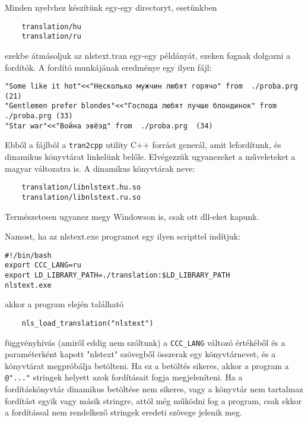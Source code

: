 Minden nyelvhez készítünk egy-egy directoryt, esetünkben 
\begin{verbatim}
    translation/hu
    translation/ru
\end{verbatim}
ezekbe átmásoljuk az nlstext.tran egy-egy példányát, 
ezeken fognak dolgozni a fordítók. A fordító munkájának
eredménye egy ilyen fájl:
\begin{verbatim}
"Some like it hot"<<"Несколько мужчин любят горячо" from  ./proba.prg  (21)
"Gentlemen prefer blondes"<<"Господа любят лучше блондинок" from ./proba.prg (33)
"Star war"<<"Война эвёэд" from  ./proba.prg  (34)
\end{verbatim}
Ebből a fájlból a \verb!tran2cpp! utility  C++ forrást generál,
amit lefordítunk, és  dinamikus könyvtárat linkelünk belőle.
Elvégezzük ugyanezeket a műveleteket a magyar változatra is.
A dinamikus könyvtárak neve:
\begin{verbatim}
    translation/libnlstext.hu.so
    translation/libnlstext.ru.so
\end{verbatim}
Természetesen ugyanez megy Windowson is, csak ott dll-eket kapunk.

Namost, ha az nlstext.exe programot egy ilyen scripttel indítjuk:
\begin{verbatim}
#!/bin/bash
export CCC_LANG=ru
export LD_LIBRARY_PATH=./translation:$LD_LIBRARY_PATH
nlstext.exe
\end{verbatim}
akkor a program elején található
\begin{verbatim}
    nls_load_translation("nlstext")
\end{verbatim}
függvényhívás (amiről eddig nem szóltunk) a \verb!CCC_LANG!
változó értékéből és a paraméterként kapott "nlstext" szövegből
összerak egy könyvtárnevet, és a könyvtárat megpróbálja betölteni. 
Ha ez a betöltés sikeres, akkor a program a \verb!@"..."! stringek
helyett azok fordításait fogja megjeleníteni. Ha a fordításkönyvtár
dinamikus betöltése nem sikeres, vagy a könyvtár nem tartalmaz fordítást
egyik vagy másik stringre, attól még  működni fog a program,
csak ekkor a fordítással nem rendelkező stringek eredeti szövege 
jelenik meg.

